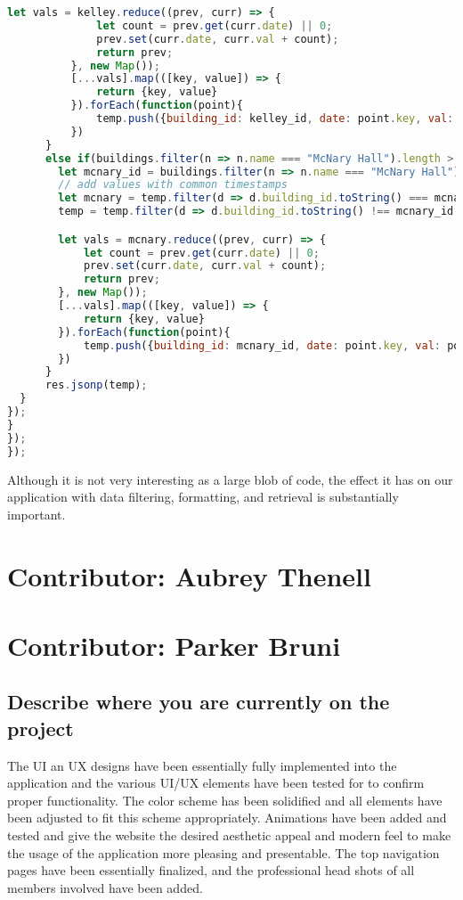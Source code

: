 \documentclass[letterpaper,10pt,serif,draftclsnofoot,onecolumn,compsoc,titlepage]{IEEEtran}
\begin{document}
\begin{lstlisting}[language=JavaScript]
          let vals = kelley.reduce((prev, curr) => {
              let count = prev.get(curr.date) || 0;
              prev.set(curr.date, curr.val + count);
              return prev;
          }, new Map());
          [...vals].map(([key, value]) => {
              return {key, value}
          }).forEach(function(point){
              temp.push({building_id: kelley_id, date: point.key, val: point.value})
          })
      }
      else if(buildings.filter(n => n.name === "McNary Hall").length > 0){
        let mcnary_id = buildings.filter(n => n.name === "McNary Hall")[0].building_id;
        // add values with common timestamps
        let mcnary = temp.filter(d => d.building_id.toString() === mcnary_id.toString());
        temp = temp.filter(d => d.building_id.toString() !== mcnary_id.toString());

        let vals = mcnary.reduce((prev, curr) => {
            let count = prev.get(curr.date) || 0;
            prev.set(curr.date, curr.val + count);
            return prev;
        }, new Map());
        [...vals].map(([key, value]) => {
            return {key, value}
        }).forEach(function(point){
            temp.push({building_id: mcnary_id, date: point.key, val: point.value})
        })
      }
      res.jsonp(temp);
  }
});
}
});
});
\end{lstlisting}

Although it is not very interesting as a large blob of code, the effect it has on our application with data filtering, formatting, and retrieval is substantially important.
\section{Contributor: Aubrey Thenell}

\section{Contributor: Parker Bruni}
\subsection{Describe where you are currently on the project}
The UI an UX designs have been essentially fully implemented into the application and the various UI/UX elements have been tested for to confirm proper functionality. The color scheme has been solidified and all elements have been adjusted to fit this scheme appropriately. Animations have been added and tested and give the website the desired aesthetic appeal and modern feel to make the usage of the application more pleasing and presentable. The top navigation pages have been essentially finalized, and the professional head shots of all members involved have been added.
\end{document}
